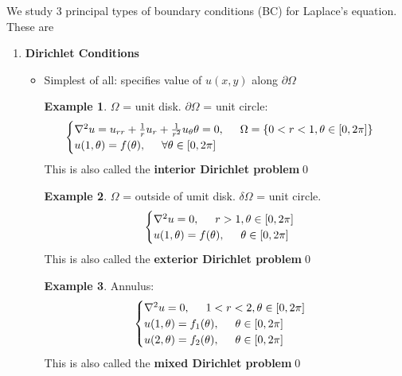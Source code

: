 \documentclass{article}
\theoremstyle{definition}
\newtheorem{exmp}{Example}[section]
\newcommand{\p}{\partial}
\newcommand{\f}[2]{\frac{#1}{#2}}
\begin{document}
	We study 3 principal types of boundary conditions (BC) for Laplace's equation. These are
	\begin{enumerate}
		\item \textbf{Dirichlet Conditions}
		\begin{itemize}
			\item Simplest of all: specifies value of $u(x,y)$ along $\p\Omega$
			\begin{exmp}
				$\Omega$ = unit disk. $\p \Omega$ = unit circle:
				\begin{align*}
				\begin{cases}
				\nabla^2 u = u_{rr} + \f{1}{r}u_r + \f{1}{r^2}u_\theta\theta = 0, \hspace{0.5cm} \Omega = \{0<r<1, \theta \in [0,2\pi]\}\\
				u(1,\theta) = f(\theta), \hspace{0.5cm} \forall \theta\in [0,2\pi]
				\end{cases}
				\end{align*}
				This is also called the \textbf{interior Dirichlet problem}\qed
			\end{exmp}
			\begin{exmp}
				$\Omega$ = outside of umit disk. $\delta \Omega$ = unit circle.
				\begin{align*}
				\begin{cases}
				\nabla^2 u =0,\hspace{0.5cm} r> 1, \theta \in [0,2\pi]\\
				u(1,\theta) = f(\theta), \hspace{0.5cm} \theta \in [0,2\pi]
				\end{cases}
				\end{align*}
				This is also called the \textbf{exterior Dirichlet problem}\qed
			\end{exmp}
			\begin{exmp}
				Annulus:
				\begin{align*}
				\begin{cases}
				\nabla^2 u =0,\hspace{0.5cm} 1 < r < 2, \theta \in [0,2\pi]\\
				u(1,\theta) = f_1(\theta), \hspace{0.5cm} \theta \in [0,2\pi]\\
				u(2,\theta) = f_2(\theta), \hspace{0.5cm} \theta \in [0,2\pi]\\
				\end{cases}
				\end{align*}
				This is also called the \textbf{mixed Dirichlet problem}\qed
			\end{exmp}
		\end{itemize}
	

\end{enumerate}
\end{document}
